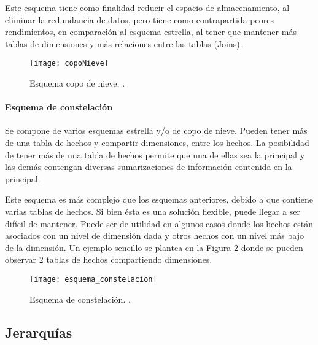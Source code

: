 \documentclass[a4paper,11pt]{article}
\begin{document}
    Este esquema tiene como finalidad reducir el espacio de almacenamiento, al eliminar la redundancia de datos, pero tiene como contrapartida
    peores rendimientos, en comparación al esquema estrella, al tener que mantener más tablas de dimensiones y más relaciones entre las tablas (Joins).
    
    \begin{figure}
      \begin{center}
        \texttt{[image: copoNieve]}
        \caption{Esquema copo de nieve. \cite[p.~39]{hefestov2}.}
        \label{snow_flk_sch}
      \end{center}
    \end{figure}
    
    
    \paragraph{Esquema de constelación}
    
    Se compone de varios esquemas estrella y/o de copo de nieve. Pueden tener más de una tabla de hechos y compartir dimensiones, entre los hechos.
    La posibilidad de tener más de una tabla de hechos permite que una de ellas sea la principal y las demás contengan diversas sumarizaciones de información
    contenida en la principal.
    
    Este esquema es más complejo que los esquemas anteriores, debido a que contiene varias tablas de hechos. Si bien ésta es una solución flexible, puede 
    llegar a ser difícil de mantener. Puede ser de utilidad en algunos casos donde los hechos están asociados con un nivel de dimensión dada y otros hechos 
    con un nivel más bajo de la dimensión. Un ejemplo sencillo se plantea en la Figura \ref{const_sch} donde se pueden observar 2 tablas de hechos 
    compartiendo dimensiones.
    
    \begin{figure}
      \begin{center}
        \texttt{[image: esquema\_constelacion]}
        \caption{Esquema de constelación. \cite[p.~41]{hefestov2}.}
        \label{const_sch}
      \end{center}
    \end{figure}
    
    
    \subsection{Jerarquías}
    
\end{document}

